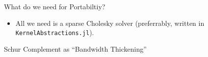 \begin{frame}{What do we need for Portabiltiy?}
  \begin{itemize}
  \item All we need is a sparse Cholesky solver (preferrably, written in {\tt KernelAbstractions.jl}).
  \end{itemize}
\end{frame}

\begin{frame}{Schur Complement as ``Bandwidth Thickening''}
  
\end{frame}

{
}




